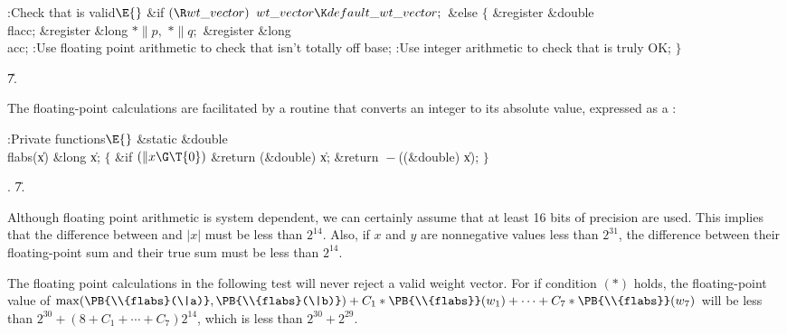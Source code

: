 \Y\B\4:Check that  is valid\X${}\E{}$\6
\&{if} ${}(\R\\{wt\_vector}){}$\1\5
${}\\{wt\_vector}\K\\{default\_wt\_vector};{}$\2\6
\&{else}\5
${}\{{}$\5
\1\&{register} \&{double} \\{flacc};\6
\&{register} \&{long} ${}{*}\|p,{}$ ${}{*}\|q;{}$\6
\&{register} \&{long} \\{acc};\7
:Use floating point arithmetic to check that  isn't
totally off base\X;\6
:Use integer arithmetic to check that  is truly OK\X;\6
\4${}\}{}$\2\par
\U7.\fi

The floating-point calculations are facilitated by a routine that
converts an integer to its absolute value, expressed as a :

\Y\B\4:Private functions\X${}\E{}$\6
\1\1\&{static} \&{double} \\{flabs}(\|x)\6
\&{long} \|x;\2\2\6
${}\{{}$\5
\1\&{if} ${}(\|x\G\T{0}){}$\1\5
\&{return} (\&{double}) \|x;\2\6
\&{return} ${}{-}{}$((\&{double}) \|x);\6
\4${}\}{}$\2\par
{}.
\U7.\fi

Although floating point arithmetic is system dependent, we can certainly
assume that at least 16 bits of precision are used. This implies that
the difference between  and $\vert x\vert$ must be less
than $2^{14}$. Also, if $x$ and $y$ are nonnegative values less than $2^{31}$,
the difference between their floating-point sum and their true sum must be
less than $2^{14}$.

The floating point calculations in the following test will never reject a
valid weight vector. For if condition $(*)$ holds, the floating-point value of
$\max(\hbox{\PB{\\{flabs}(\|a)}},\hbox{\PB{\\{flabs}(\|b)}})+C_1*\PB{%
\\{flabs}}(w_1)+\cdots
+C_7*\PB{\\{flabs}}(w_7)$ will be less than $2^{30}+(8+C_1+\cdots+C_7)2^{14}$,
which is less than $2^{30}+2^{29}$.

